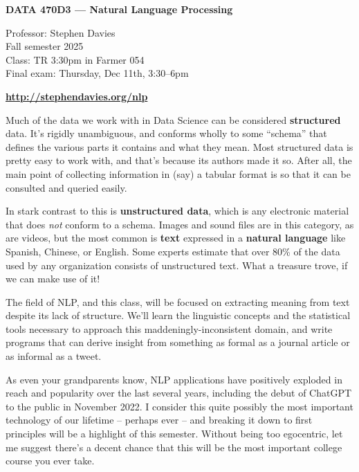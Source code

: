 \documentclass[12pt]{article}
\begin{document}
\begin{center}
\begin{Large}
\textbf{DATA 470D3 --- Natural Language Processing} \\
\end{Large}
\vspace{.10in}
\begin{small}
Professor: Stephen Davies\\
Fall semester 2025\\
\vspace{.05in}
Class: TR 3:30pm in Farmer 054\\
\vspace{.05in}
Final exam: Thursday, Dec 11th, 3:30--6pm\\
\vspace{.10in}
\end{small}


\vspace{.10in}

\textbf{\url{http://stephendavies.org/nlp}}

\end{center}

Much of the data we work with in Data Science can be considered
\textbf{structured} data. It's rigidly unambiguous, and conforms wholly to some
``schema'' that defines the various parts it contains and what they mean. Most
structured data is pretty easy to work with, and that's because its authors
made it so. After all, the main point of collecting information in (say) a
tabular format is so that it can be consulted and queried easily.

In stark contrast to this is \textbf{unstructured data}, which is any
electronic material that does \textit{not} conform to a schema. Images and
sound files are in this category, as are videos, but the most common is
\textbf{text} expressed in a \textbf{natural language} like Spanish, Chinese,
or English. Some experts estimate that over 80\% of the data used by any
organization consists of unstructured text. What a treasure trove, if we can
make use of it!

The field of NLP, and this class, will be focused on extracting meaning from
text despite its lack of structure. We'll learn the linguistic concepts and the
statistical tools necessary to approach this maddeningly-inconsistent domain,
and write programs that can derive insight from something as formal as a
journal article or as informal as a tweet.

As even your grandparents know, NLP applications have positively exploded in
reach and popularity over the last several years, including the debut of
ChatGPT to the public in November 2022. I consider this quite possibly the most
important technology of our lifetime -- perhaps ever -- and breaking it down
to first principles will be a highlight of this semester. Without being too
egocentric, let me suggest there's a decent chance that this will be the most
important college course you ever take.
\end{document}
